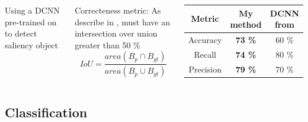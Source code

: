 \documentclass[aspectratio=169]{beamer}
\newenvironment{myframe}[1][t]{\begin{frame}[#1]{\secname}{\subsecname}}{\end{frame}}
\begin{document}
    \begin{myframe}
        \begin{columns}
            Using a DCNN pre-trained on \cite{zhang2015SOD} to detect saliency object
            
            \vspace{0.5cm}
            
            Correcteness metric: As describe in \cite{pascalVoc2012}, must have an intersection over union greater than 50 \%
            $$IoU = \frac{area(B_p \cap B_{gt})}{area(B_p \cup B_{gt})}$$
            
            \begin{center}
                \renewcommand{\arraystretch}{1.3} %
                \begin{tabular}{||c | c c||} 
                    \hline
                    Metric & My method & DCNN from \cite{Bolanos2016} \\
                    \hline\hline
                    Accuracy & \textbf{73 \%} & 60 \% \\ 
                    \hline
                    Recall &  \textbf{74 \%} & 80 \% \\
                    \hline
                    Precision &  \textbf{79 \%} & 70 \% \\
                    \hline
                \end{tabular}
            \end{center}
        \end{columns}
    \end{myframe}
    
    \subsection{Classification}
    
\end{document}
